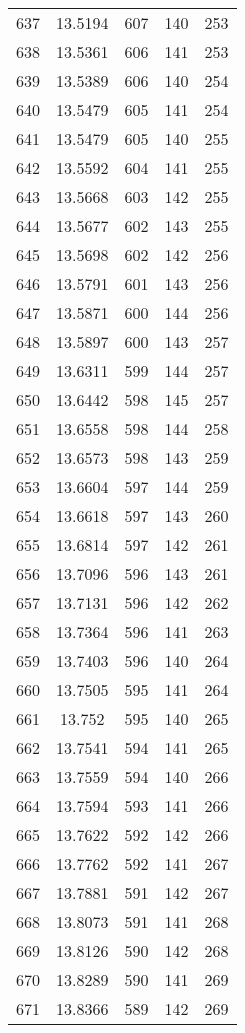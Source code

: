 \documentclass[12pt,a4paper]{article}
\begin{document}
\begin{tabular}{r|cccc}
	637 & 13.5194 & 607 & 140 & 253 \\
	638 & 13.5361 & 606 & 141 & 253 \\
	639 & 13.5389 & 606 & 140 & 254 \\
	640 & 13.5479 & 605 & 141 & 254 \\
	641 & 13.5479 & 605 & 140 & 255 \\
	642 & 13.5592 & 604 & 141 & 255 \\
	643 & 13.5668 & 603 & 142 & 255 \\
	644 & 13.5677 & 602 & 143 & 255 \\
	645 & 13.5698 & 602 & 142 & 256 \\
	646 & 13.5791 & 601 & 143 & 256 \\
	647 & 13.5871 & 600 & 144 & 256 \\
	648 & 13.5897 & 600 & 143 & 257 \\
	649 & 13.6311 & 599 & 144 & 257 \\
	650 & 13.6442 & 598 & 145 & 257 \\
	651 & 13.6558 & 598 & 144 & 258 \\
	652 & 13.6573 & 598 & 143 & 259 \\
	653 & 13.6604 & 597 & 144 & 259 \\
	654 & 13.6618 & 597 & 143 & 260 \\
	655 & 13.6814 & 597 & 142 & 261 \\
	656 & 13.7096 & 596 & 143 & 261 \\
	657 & 13.7131 & 596 & 142 & 262 \\
	658 & 13.7364 & 596 & 141 & 263 \\
	659 & 13.7403 & 596 & 140 & 264 \\
	660 & 13.7505 & 595 & 141 & 264 \\
	661 & 13.752 & 595 & 140 & 265 \\
	662 & 13.7541 & 594 & 141 & 265 \\
	663 & 13.7559 & 594 & 140 & 266 \\
	664 & 13.7594 & 593 & 141 & 266 \\
	665 & 13.7622 & 592 & 142 & 266 \\
	666 & 13.7762 & 592 & 141 & 267 \\
	667 & 13.7881 & 591 & 142 & 267 \\
	668 & 13.8073 & 591 & 141 & 268 \\
	669 & 13.8126 & 590 & 142 & 268 \\
	670 & 13.8289 & 590 & 141 & 269 \\
	671 & 13.8366 & 589 & 142 & 269 \\

\end{tabular}
\end{document}
